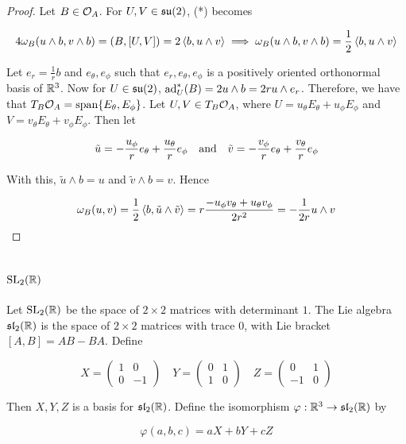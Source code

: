 \documentclass{article}
\newcommand{\su}{\mfs\mfu}
\renewcommand{\sl}{\mfs\mfl}
\begin{document}
\begin{proof}
    Let \(B \in \mathcal{O}_A\). For \(U, V \in \su(2)\), (*) becomes

    \[4\omega_B(u \wedge b, v \wedge b) = (B, [U, V]) = 2\left\langle b, u \wedge v \right\rangle \implies \omega_B(u\wedge b, v \wedge b) = \frac{1}{2}\left\langle b, u \wedge v \right\rangle\]

    Let \(e_r = \frac{1}{r}b\) and \(e_\theta, e_\phi\) such that \(e_r, e_\theta, e_\phi\) is a positively oriented orthonormal basis of \(\mathbb{R}^3\). Now for \(U \in \su(2)\), \(\operatorname{ad}_U^*(B) = 2u\wedge b = 2ru \wedge e_r\). Therefore, we have that \(T_B\mathcal{O}_A = \operatorname{span}\{E_\theta, E_\phi\}\). Let \(U, V \in T_B\mathcal{O}_A\), where \(U = u_\theta E_\theta + u_\phi E_\phi\) and \(V = v_\theta E_\theta + v_\phi E_\phi\). Then let

    \[\tilde u = -\frac{u_\phi}{r}e_\theta + \frac{u_\theta}{r}e_\phi \qqtext{and}\tilde v = -\frac{v_\phi}{r}e_\theta + \frac{v_\theta}{r}e_\phi\]

    With this, \(\tilde u \wedge b = u\) and \(\tilde v \wedge b = v\). Hence
    
    \[\omega_B(u, v) = \frac{1}{2}\left\langle b, \tilde u \wedge \tilde v \right\rangle = r\frac{-u_\phi v_\theta + u_\theta v_\phi}{2r^2} = -\frac{1}{2r}u \wedge v\]
\end{proof}

\section{\(\operatorname{SL}_2(\mathbb{R})\)}

Let \(\operatorname{SL}_2(\mathbb{R})\) be the space of \(2 \times 2\) matrices with determinant \(1\). The Lie algebra \(\sl_2(\R)\) is the space of \(2 \times 2\) matrices with trace \(0\), with Lie bracket \([A, B] = AB - BA\). Define

\[X = \begin{pmatrix}
    1 & 0 \\ 0 & -1
\end{pmatrix} \quad Y = \begin{pmatrix}
    0 & 1 \\ 1 & 0
\end{pmatrix} \quad Z = \begin{pmatrix}
    0 & 1 \\ -1 & 0
\end{pmatrix}\]

Then \(X, Y, Z\) is a basis for \(\sl_2(\R)\). Define the isomorphism \(\varphi : \R^3 \to \sl_2(\R)\) by

\[\varphi(a, b, c) = aX + bY + cZ\]
\end{document}
